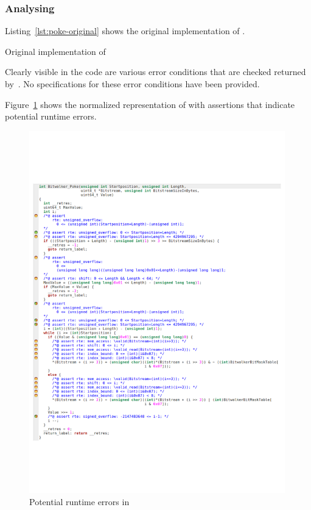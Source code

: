 \clearpage

\subsubsection{Analysing \poke}

Listing~\ref{lst:poke-original} shows the original implementation of \poke.

\begin{listing}[hbt]
\begin{minipage}{\textwidth}

\end{minipage}
\caption{\label{lst:poke-original} Original implementation of \poke}
\end{listing}

Clearly visible in the code are various error conditions that are checked 
returned by~\poke.
No specifications for these error conditions have been provided.
 
\clearpage


Figure~\ref{fig:poke-wp} shows the normalized representation of \poke
with \acsl assertions that indicate potential runtime errors.

\begin{figure}[hbt]
\begin{center}
\includegraphics[width=0.99\textwidth]{figures/poke-wp.pdf}
\caption{\label{fig:poke-wp} Potential runtime errors in \peek}
\end{center}
\end{figure}

